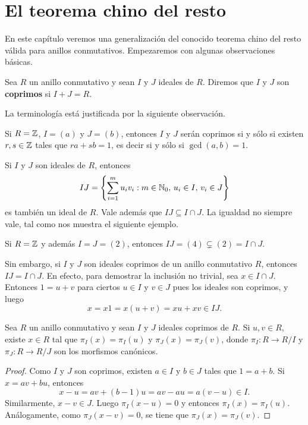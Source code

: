 \chapter{El teorema chino del resto}

En este capítulo veremos una generalización del conocido teorema chino del resto válida para anillos conmutativos. 
Empezaremos con algunas observaciones básicas. 

\begin{definition}
Sea $R$ un anillo conmutativo y sean $I$ y $J$ ideales de $R$. Diremos que $I$ y $J$ son \textbf{coprimos}
si $I+J=R$. 	
\end{definition}

La terminología está justificada por la siguiente observación.

\begin{example}
Si $R=\mathbb{Z}$, $I=(a)$ y $J=(b)$, entonces $I$ y $J$ serán coprimos si y sólo si existen $r,s\in\mathbb{Z}$ tales que $ra+sb=1$, es decir si y sólo si $\gcd(a,b)=1$. 	
\end{example}

Si $I$ y $J$ son ideales de $R$, entonces
\[
IJ=\left\{\sum_{i=1}^mu_iv_i:m\in\mathbb{N}_0,\,u_i\in I,\,v_i\in J\right\}
\]
es también un ideal de $R$. Vale además que $IJ\subseteq I\cap J$. La igualdad no siempre vale, tal como nos muestra el siguiente ejemplo.

\begin{example}
Si $R=\mathbb{Z}$ y además $I=J=(2)$, entonces $IJ=(4)\subsetneq (2)=I\cap J$. 	
\end{example}

Sin embargo, si $I$ y $J$ son ideales coprimos de un anillo conmutativo $R$, entonces $IJ=I\cap J$. En efecto, para demostrar la inclusión no trivial, 
sea $x\in I\cap J$. Entonces $1=u+v$ para ciertos $u\in I$ y $v\in J$ pues los ideales son coprimos, y luego 
\[
x=x1=x(u+v)=xu+xv\in IJ. 
\]


\begin{theorem}
Sea $R$ un anillo conmutativo y sean $I$ y $J$ ideales coprimos de $R$. Si $u,v\in R$, existe $x\in R$ tal que
$\pi_I(x)=\pi_I(u)$ y $\pi_J(x)=\pi_J(v)$, donde $\pi_I\colon R\to R/I$ y $\pi_J\colon R\to R/J$ son los morfismos canónicos. 
\end{theorem}

\begin{proof}
	Como $I$ y $J$ son coprimos, existen $a\in I$ y $b\in J$ tales que $1=a+b$. Si $x=av+bu$, entonces 
	\[
	x-u=av+(b-1)u=av-au=a(v-u)\in I.
	\]
	Similarmente, $x-v\in J$. Luego $\pi_I(x-u)=0$ y entonces $\pi_I(x)=\pi_I(u)$. Análogamente, como $\pi_J(x-v)=0$, se tiene que $\pi_J(x)=\pi_J(v)$.   
\end{proof}

